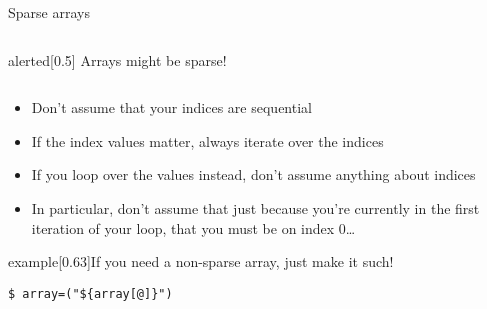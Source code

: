 \begin{frame}[fragile]{Sparse arrays}
    \medskip
    \begin{columns}[c]
        \begin{column}{0.75\textwidth}
            \begin{varblock}{alerted}[0.5\textwidth]{}
                \Large \alert{Arrays might be sparse!}
            \end{varblock}
        \end{column}
        \begin{column}{0.25\textwidth}
        \end{column}
    \end{columns}
    \bigskip
    \begin{itemize}
        \item Don't assume that your indices are sequential
        \item If the index values matter, always iterate over the indices 
        \item If you loop over the values instead, don't assume anything about indices
        \item In particular, don't assume that just because you're currently in the first iteration of your loop, that you must be on index 0\ldots
    \end{itemize}
    \begin{varblock}{example}[0.63\textwidth]{\large If you need a non-sparse array, just make it such!}
        \begin{lstlisting}[style=MyBash, numbers=none, aboveskip=2mm, belowskip=-5mm, xleftmargin=13mm, xrightmargin=13mm]
            $ array=("${array[@]}")
        \end{lstlisting}
    \end{varblock}
\end{frame}
